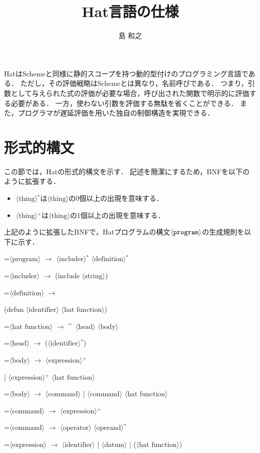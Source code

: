 \documentclass[twocolumn]{jarticle}
\def\hat{\mbox{\^{ }}}
\def\|{$|$}
\newcommand{\NT}[1]{\ensuremath{\langle\mbox{#1}\rangle}\allowbreak}
\newcommand{\lrto}{ \ensuremath{\rightarrow} \allowbreak}
\newenvironment{hang}[1][\parindent]
  {\def\item{\par\hangindent=#1\noindent}}
  {\par}
\begin{document}
\title{Hat言語の仕様}
\author{島 和之}
\maketitle

HatはSchemeと同様に静的スコープを持つ動的型付けのプログラミング言語である．
ただし，その評価戦略はSchemeとは異なり，名前呼びである．
つまり，引数として与えられた式の評価が必要な場合，呼び出された関数で明示的に評価する必要がある．
一方，使わない引数を評価する無駄を省くことができる．
また，プログラマが遅延評価を用いた独自の制御構造を実現できる．

\section{形式的構文}

この節では，Hatの形式的構文を示す．
記述を簡潔にするため，BNFを以下のように拡張する．
\begin{itemize}
\item\NT{thing}$^*$は\NT{thing}の0個以上の出現を意味する．
\item\NT{thing}$^+$は\NT{thing}の1個以上の出現を意味する．
\end{itemize}
上記のように拡張したBNFで，Hatプログラムの構文\NT{\tt program}の生成規則を以下に示す．
\begin{hang}\tt %
\item\NT{program}\lrto
  \NT{includer}$^*$ \NT{definition}$^*$
\item\NT{includer}\lrto
  (include \NT{string})
\item\NT{definition}\lrto\par
  (defun \NT{identifier} \NT{hat function})
\item\NT{hat function}\lrto
  \hat\ \NT{head} \NT{body}
\item\NT{head}\lrto
  (\NT{identifier}$^*$)
\item\NT{body}\lrto
  \NT{expression}$^+$\par
  | \NT{expression}$^+$ \NT{hat function}
\item\NT{body}\lrto
  \NT{command} | \NT{command} \NT{hat function}
\item\NT{command}\lrto
  \NT{expression}$^+$
\item\NT{command}\lrto
  \NT{operator} \NT{operand}$^*$
\item\NT{expression}\lrto
  \NT{identifier} \| \NT{datum} \| (\NT{hat function})
\end{hang}
\end{document}
